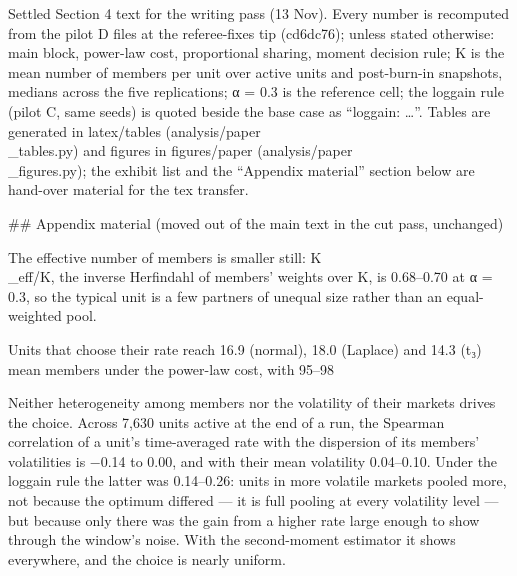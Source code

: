 Settled Section 4 text for the writing pass (13 Nov). Every number is recomputed from the pilot D files at the referee-fixes tip (cd6dc76); unless stated otherwise: main block, power-law cost, proportional sharing, moment decision rule; K is the mean number of members per unit over active units and post-burn-in snapshots, medians across the five replications; α = 0.3 is the reference cell; the loggain rule (pilot C, same seeds) is quoted beside the base case as “loggain: …”. Tables are generated in latex/tables (analysis/paper\\_tables.py) and figures in figures/paper (analysis/paper\\_figures.py); the exhibit list and the “Appendix material” section below are hand-over material for the tex transfer.

## Appendix material (moved out of the main text in the cut pass, unchanged)

The effective number of members is smaller still: K\\_eff/K, the inverse Herfindahl of members' weights over K, is 0.68–0.70 at α = 0.3, so the typical unit is a few partners of unequal size rather than an equal-weighted pool.

Units that choose their rate reach 16.9 (normal), 18.0 (Laplace) and 14.3 (t₃) mean members under the power-law cost, with 95–98%

Neither heterogeneity among members nor the volatility of their markets drives the choice. Across 7,630 units active at the end of a run, the Spearman correlation of a unit's time-averaged rate with the dispersion of its members' volatilities is −0.14 to 0.00, and with their mean volatility 0.04–0.10. Under the loggain rule the latter was 0.14–0.26: units in more volatile markets pooled more, not because the optimum differed — it is full pooling at every volatility level — but because only there was the gain from a higher rate large enough to show through the window's noise. With the second-moment estimator it shows everywhere, and the choice is nearly uniform.

